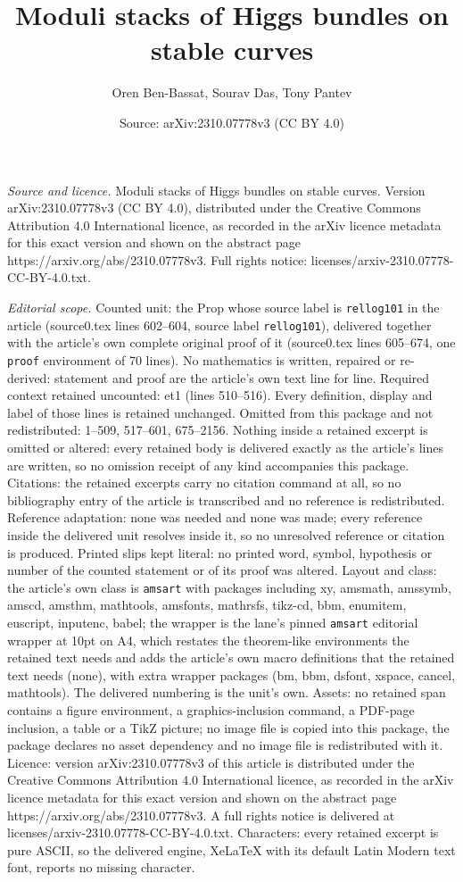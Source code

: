 \documentclass[10pt,a4paper]{amsart}
\title[Moduli stacks of Higgs bundles on stable curves]{Moduli stacks of Higgs bundles on stable curves}
\author{Oren Ben-Bassat, Sourav Das, Tony Pantev}
\date{Source: arXiv:2310.07778v3 (CC BY 4.0)}
\begin{document}
\maketitle

\noindent\emph{Source and licence.} Moduli stacks of Higgs bundles on stable curves. Version arXiv:2310.07778v3 (CC BY 4.0), distributed under the Creative Commons Attribution 4.0 International licence, as recorded in the arXiv licence metadata for this exact version and shown on the abstract page https://arxiv.org/abs/2310.07778v3. Full rights notice: licenses/arxiv-2310.07778-CC-BY-4.0.txt.\par\smallskip

\noindent\textit{Editorial scope.} Counted unit: the Prop whose source label is \texttt{rellog101} in the article (source0.tex lines 602--604, source label \texttt{rellog101}), delivered together with the article's own complete original proof of it (source0.tex lines 605--674, one \texttt{proof} environment of 70 lines). No mathematics is written, repaired or re-derived: statement and proof are the article's own text line for line. Required context retained uncounted: et1 (lines 510--516). Every definition, display and label of those lines is retained unchanged. Omitted from this package and not redistributed: 1--509, 517--601, 675--2156. Nothing inside a retained excerpt is omitted or altered: every retained body is delivered exactly as the article's lines are written, so no omission receipt of any kind accompanies this package. Citations: the retained excerpts carry no citation command at all, so no bibliography entry of the article is transcribed and no reference is redistributed. Reference adaptation: none was needed and none was made; every reference inside the delivered unit resolves inside it, so no unresolved reference or citation is produced. Printed slips kept literal: no printed word, symbol, hypothesis or number of the counted statement or of its proof was altered. Layout and class: the article's own class is \texttt{amsart} with packages including xy, amsmath, amssymb, amscd, amsthm, mathtools, amsfonts, mathrsfs, tikz-cd, bbm, enumitem, euscript, inputenc, babel; the wrapper is the lane's pinned \texttt{amsart} editorial wrapper at 10pt on A4, which restates the theorem-like environments the retained text needs and adds the article's own macro definitions that the retained text needs (none), with extra wrapper packages (bm, bbm, dsfont, xspace, cancel, mathtools). The delivered numbering is the unit's own. Assets: no retained span contains a figure environment, a graphics-inclusion command, a PDF-page inclusion, a table or a TikZ picture; no image file is copied into this package, the package declares no asset dependency and no image file is redistributed with it. Licence: version arXiv:2310.07778v3 of this article is distributed under the Creative Commons Attribution 4.0 International licence, as recorded in the arXiv licence metadata for this exact version and shown on the abstract page https://arxiv.org/abs/2310.07778v3. A full rights notice is delivered at licenses/arxiv-2310.07778-CC-BY-4.0.txt. Characters: every retained excerpt is pure ASCII, so the delivered engine, XeLaTeX with its default Latin Modern text font, reports no missing character.
\end{document}
